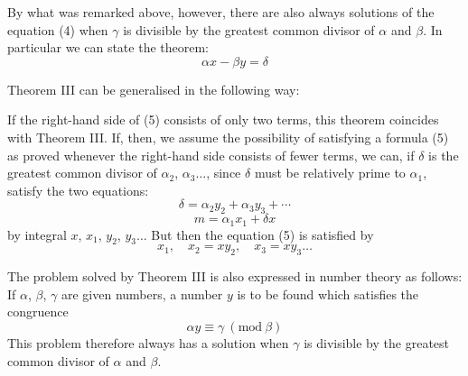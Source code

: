 By what was remarked above, however, there are also always solutions of the equation (4) when $\gamma$ is divisible by the greatest common divisor of $\alpha$ and $\beta$. In particular we can state the theorem: 
\[
\alpha x - \beta y = \delta
\]

Theorem III can be generalised in the following way:



If the right-hand side of (5) consists of only two terms, this theorem coincides with Theorem III. If, then, we assume the possibility of satisfying a formula (5) as proved whenever the right-hand side consists of fewer terms, we can, if $\delta$ is the greatest common divisor of $\alpha_2$, $\alpha_3 \ldots$, since $\delta$ must be relatively prime to $\alpha_1$, satisfy the two equations:
\[
\delta = \alpha_2 y_2 + \alpha_3 y_3 + \cdots
\]
\[
m = \alpha_1 x_1 + \delta x
\]
by integral $x$, $x_1$, $y_2$, $y_3 \ldots$ But then the equation (5) is satisfied by
\[
x_1, \quad x_2 = x y_2, \quad x_3 = x y_3 \ldots
\]

The problem solved by Theorem III is also expressed in number theory as follows: If $\alpha$, $\beta$, $\gamma$ are given numbers, a number $y$ is to be found which satisfies the congruence
\[
\alpha y \equiv \gamma \ (\mathrm{mod}\ \beta)
\]
This problem therefore always has a solution when $\gamma$ is divisible by the greatest common divisor of $\alpha$ and $\beta$.

